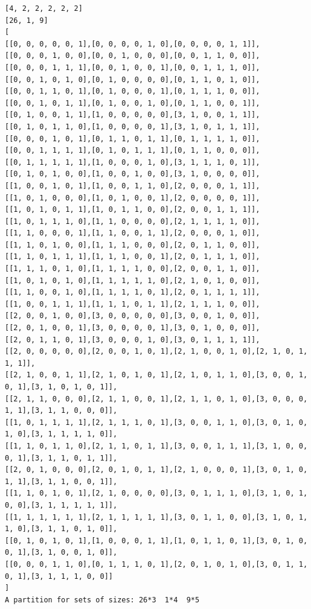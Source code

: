 \documentclass[final]{dmtcs-episciences}
\begin{document}
\begin{appendices}
\begin{verbatim} 
[4, 2, 2, 2, 2, 2]
[26, 1, 9]
[
[[0, 0, 0, 0, 0, 1],[0, 0, 0, 0, 1, 0],[0, 0, 0, 0, 1, 1]],
[[0, 0, 0, 1, 0, 0],[0, 0, 1, 0, 0, 0],[0, 0, 1, 1, 0, 0]],
[[0, 0, 0, 1, 1, 1],[0, 0, 1, 0, 0, 1],[0, 0, 1, 1, 1, 0]],
[[0, 0, 1, 0, 1, 0],[0, 1, 0, 0, 0, 0],[0, 1, 1, 0, 1, 0]],
[[0, 0, 1, 1, 0, 1],[0, 1, 0, 0, 0, 1],[0, 1, 1, 1, 0, 0]],
[[0, 0, 1, 0, 1, 1],[0, 1, 0, 0, 1, 0],[0, 1, 1, 0, 0, 1]],
[[0, 1, 0, 0, 1, 1],[1, 0, 0, 0, 0, 0],[3, 1, 0, 0, 1, 1]],
[[0, 1, 0, 1, 1, 0],[1, 0, 0, 0, 0, 1],[3, 1, 0, 1, 1, 1]],
[[0, 0, 0, 1, 0, 1],[0, 1, 1, 0, 1, 1],[0, 1, 1, 1, 1, 0]],
[[0, 0, 1, 1, 1, 1],[0, 1, 0, 1, 1, 1],[0, 1, 1, 0, 0, 0]],
[[0, 1, 1, 1, 1, 1],[1, 0, 0, 0, 1, 0],[3, 1, 1, 1, 0, 1]],
[[0, 1, 0, 1, 0, 0],[1, 0, 0, 1, 0, 0],[3, 1, 0, 0, 0, 0]],
[[1, 0, 0, 1, 0, 1],[1, 0, 0, 1, 1, 0],[2, 0, 0, 0, 1, 1]],
[[1, 0, 1, 0, 0, 0],[1, 0, 1, 0, 0, 1],[2, 0, 0, 0, 0, 1]],
[[1, 0, 1, 0, 1, 1],[1, 0, 1, 1, 0, 0],[2, 0, 0, 1, 1, 1]],
[[1, 0, 1, 1, 1, 0],[1, 1, 0, 0, 0, 0],[2, 1, 1, 1, 1, 0]],
[[1, 1, 0, 0, 0, 1],[1, 1, 0, 0, 1, 1],[2, 0, 0, 0, 1, 0]],
[[1, 1, 0, 1, 0, 0],[1, 1, 1, 0, 0, 0],[2, 0, 1, 1, 0, 0]],
[[1, 1, 0, 1, 1, 1],[1, 1, 1, 0, 0, 1],[2, 0, 1, 1, 1, 0]],
[[1, 1, 1, 0, 1, 0],[1, 1, 1, 1, 0, 0],[2, 0, 0, 1, 1, 0]],
[[1, 0, 1, 0, 1, 0],[1, 1, 1, 1, 1, 0],[2, 1, 0, 1, 0, 0]],
[[1, 1, 0, 0, 1, 0],[1, 1, 1, 1, 0, 1],[2, 0, 1, 1, 1, 1]],
[[1, 0, 0, 1, 1, 1],[1, 1, 1, 0, 1, 1],[2, 1, 1, 1, 0, 0]],
[[2, 0, 0, 1, 0, 0],[3, 0, 0, 0, 0, 0],[3, 0, 0, 1, 0, 0]],
[[2, 0, 1, 0, 0, 1],[3, 0, 0, 0, 0, 1],[3, 0, 1, 0, 0, 0]],
[[2, 0, 1, 1, 0, 1],[3, 0, 0, 0, 1, 0],[3, 0, 1, 1, 1, 1]],
[[2, 0, 0, 0, 0, 0],[2, 0, 0, 1, 0, 1],[2, 1, 0, 0, 1, 0],[2, 1, 0, 1, 1, 1]],
[[2, 1, 0, 0, 1, 1],[2, 1, 0, 1, 0, 1],[2, 1, 0, 1, 1, 0],[3, 0, 0, 1, 0, 1],[3, 1, 0, 1, 0, 1]],
[[2, 1, 1, 0, 0, 0],[2, 1, 1, 0, 0, 1],[2, 1, 1, 0, 1, 0],[3, 0, 0, 0, 1, 1],[3, 1, 1, 0, 0, 0]],
[[1, 0, 1, 1, 1, 1],[2, 1, 1, 1, 0, 1],[3, 0, 0, 1, 1, 0],[3, 0, 1, 0, 1, 0],[3, 1, 1, 1, 1, 0]],
[[1, 1, 0, 1, 1, 0],[2, 1, 1, 0, 1, 1],[3, 0, 0, 1, 1, 1],[3, 1, 0, 0, 0, 1],[3, 1, 1, 0, 1, 1]],
[[2, 0, 1, 0, 0, 0],[2, 0, 1, 0, 1, 1],[2, 1, 0, 0, 0, 1],[3, 0, 1, 0, 1, 1],[3, 1, 1, 0, 0, 1]],
[[1, 1, 0, 1, 0, 1],[2, 1, 0, 0, 0, 0],[3, 0, 1, 1, 1, 0],[3, 1, 0, 1, 0, 0],[3, 1, 1, 1, 1, 1]],
[[1, 1, 1, 1, 1, 1],[2, 1, 1, 1, 1, 1],[3, 0, 1, 1, 0, 0],[3, 1, 0, 1, 1, 0],[3, 1, 1, 0, 1, 0]],
[[0, 1, 0, 1, 0, 1],[1, 0, 0, 0, 1, 1],[1, 0, 1, 1, 0, 1],[3, 0, 1, 0, 0, 1],[3, 1, 0, 0, 1, 0]],
[[0, 0, 0, 1, 1, 0],[0, 1, 1, 1, 0, 1],[2, 0, 1, 0, 1, 0],[3, 0, 1, 1, 0, 1],[3, 1, 1, 1, 0, 0]]
]
A partition for sets of sizes: 26*3  1*4  9*5
\end{verbatim}
\newpage


\end{appendices}
\end{document}
